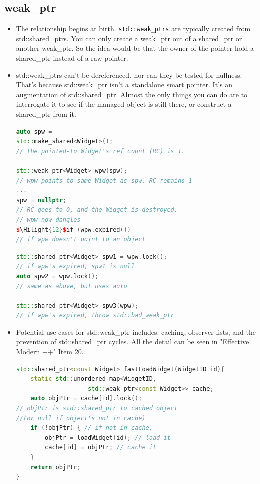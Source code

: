 \documentclass[a4paper,11pt,twoside]{book}
\newcommand{\Hilight}[1]{\makebox[0pt][l]{\color{yellow}\rule[-3pt]{#1em}{11pt}}}
\newcommand{\Hilight}[1]{}
\begin{document}
\subsection{weak\_ptr}
\begin{itemize}

\item The relationship begins at birth. \texttt{std::weak\_ptrs} are typically created from std::shared\_ptrs. You can only create a weak\_ptr out of a shared\_ptr or another weak\_ptr. So the idea would be that the owner of the pointer hold a shared\_ptr instead of a raw pointer.


\item std::weak\_ptrs can't be dereferenced, nor can they be tested for nullness. That's because std::weak\_ptr isn't a standalone smart pointer. It's an augmentation of std::shared\_ptr. Almost the only things you can do are to interrogate it to see if the managed object is still there, or construct a shared\_ptr from it.

\begin{lstlisting}[frame=single, language=c++,mathescape=true]
auto spw =
std::make_shared<Widget>();
// the pointed-to Widget's ref count (RC) is 1.

std::weak_ptr<Widget> wpw(spw);
// wpw points to same Widget as spw. RC remains 1
...
spw = nullptr;
// RC goes to 0, and the Widget is destroyed.
// wpw now dangles
$\Hilight{12}$if (wpw.expired())
// if wpw doesn't point to an object
\end{lstlisting}

\begin{lstlisting}[frame=single, language=c++,mathescape=true]
std::shared_ptr<Widget> spw1 = wpw.lock();
// if wpw's expired, spw1 is null
auto spw2 = wpw.lock();
// same as above, but uses auto

std::shared_ptr<Widget> spw3(wpw);
// if wpw's expired, throw std::bad_weak_ptr
\end{lstlisting}


\item Potential use cases for std::weak\_ptr includes: caching, observer lists, and the prevention of std::shared\_ptr cycles.  All the detail can be seen in "Effective Modern ++" Item 20.
\begin{lstlisting}[frame=single, language=c++]
std::shared_ptr<const Widget> fastLoadWidget(WidgetID id){
	static std::unordered_map<WidgetID, 
	                std::weak_ptr<const Widget>> cache;
	auto objPtr = cache[id].lock();
// objPtr is std::shared_ptr to cached object 
//(or null if object's not in cache)
	if (!objPtr) { // if not in cache,
		objPtr = loadWidget(id); // load it
		cache[id] = objPtr; // cache it
	}
	return objPtr;
}
\end{lstlisting}


\end{itemize}
\end{document}
